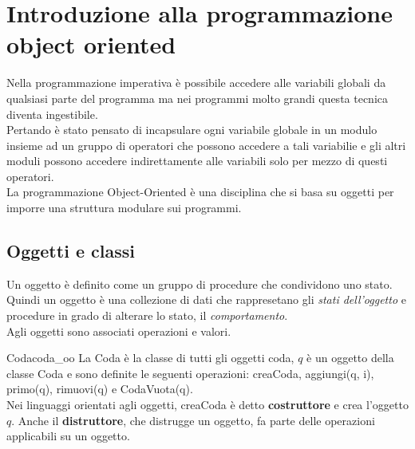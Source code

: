\documentclass[12pt]{report}
\newcommand{\nmu}{}
\begin{document}
	\chapter{Introduzione alla programmazione object oriented}
	Nella programmazione imperativa è possibile accedere alle variabili globali da qualsiasi parte del programma ma nei programmi molto grandi questa tecnica diventa ingestibile. \\
	Pertando è stato pensato di incapsulare ogni variabile globale in un modulo insieme ad un gruppo di operatori che possono accedere a tali variabilie e gli altri moduli possono accedere indirettamente alle variabili solo per mezzo di questi operatori. \\
	La programmazione Object-Oriented è una disciplina che si basa su oggetti per imporre una struttura modulare sui programmi.
	\section{Oggetti e classi}
	Un oggetto è definito come un gruppo di procedure che condividono uno stato. Quindi un oggetto è una collezione di dati che rappresetano gli \textit{stati dell'oggetto} e procedure in grado di alterare lo stato, il \textit{comportamento}. \\
	Agli oggetti sono associati operazioni e valori.
	\begin{example}{\nmu Coda}{coda_oo}
		La Coda è la classe di tutti gli oggetti coda, $q$ è un oggetto della classe Coda e sono definite le seguenti operazioni: creaCoda, aggiungi(q, i), primo(q), rimuovi(q) e CodaVuota(q). \\
		Nei linguaggi orientati agli oggetti, creaCoda è detto \textbf{costruttore} e crea l'oggetto $q$. Anche il \textbf{distruttore}, che distrugge un oggetto, fa parte delle operazioni applicabili su un oggetto.
	\end{example}
\end{document}
